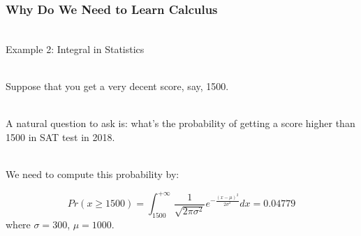 \documentclass{beamer}
\numberwithin{equation}{section}
\begin{document}
\begin{frame}
\frametitle{Why Do We Need to Learn Calculus}

\ \\Example 2: Integral in Statistics \pause

\ \\Suppose that you get a very decent score, say, 1500. \pause

\ \\A natural question to ask is: what's the probability of getting a score higher than 1500 in SAT test in 2018.

\ \\We need to compute this probability by: \pause

$$Pr(x \geq 1500) = \int_{1500}^{+ \infty} {\frac {1}{\sqrt {2\pi \sigma ^{2}}}}e^{-{\frac {(x-\mu )^{2}}{2\sigma ^{2}}}} dx = 0.04779$$
where $\sigma = 300$, $\mu = 1000$.

\end{frame}
\end{document}
